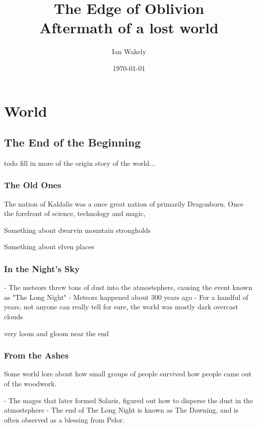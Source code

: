 \documentclass[letterpaper, twocolumn, openany, nodeprecatedcode, layout=true]{dndbook}
\title{The Edge of Oblivion \\
\large Aftermath of a lost world}
\author{Ian Wakely}
\date{\today}
\begin{document}
\frontmatter

\maketitle

\tableofcontents

\mainmatter%

\part{World}

\chapter{The End of the Beginning}

todo fill in more of the origin story of the world...

\section{The Old Ones}

The nation of Kaldalis was a once great nation of primarily Dragonborn. Once the forefront of science,
technology and magic, 

Something about dwarvin mountain strongholds

Something about elven places

\section{In the Night's Sky}

- The meteors threw tons of dust into the atmostsphere, causing the event known as "The Long Night"
- Meteors happened about 300 years ago
- For a handful of years, not anyone can really tell for sure, the world was mostly dark overcast clouds

very loom and gloom near the end

\section{From the Ashes}

Some world lore about how small groups of people survived how people came out of the woodwork.


- The mages that later formed Solaris, figured out how to disperse the dust in the atmostsphere
- The end of The Long Night is known as The Dawning, and is often observed as a blessing from Pelor.
\end{document}
